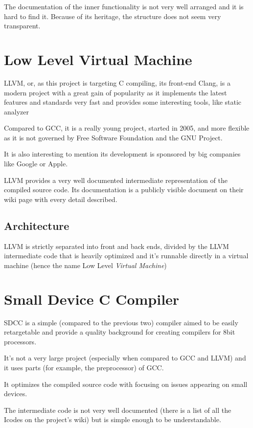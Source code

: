     The documentation of the inner functionality is not very well arranged and it is hard to find it. Because of its heritage, the structure does not seem very transparent.

    \section{Low Level Virtual Machine}

    LLVM, or, as this project is targeting C compiling, its front-end Clang, is a modern project with a great gain of popularity as it implements the latest features and standards very fast and provides some interesting tools, like static analyzer

    Compared to GCC, it is a really young project, started in 2005, and more flexible as it is not governed by Free Software Foundation and the GNU Project.

    It is also interesting to mention its development is sponsored by big companies like Google or Apple.

    LLVM provides a very well documented intermediate representation of the compiled source code. Its documentation is a publicly visible document on their wiki page with every detail described.

        \subsection{Architecture}

        LLVM is strictly separated into front and back ends, divided by the LLVM intermediate code that is heavily optimized and it's runnable directly in a virtual machine (hence the name Low Level \emph{Virtual Machine})

    \section{Small Device C Compiler}

    SDCC is a simple (compared to the previous two) compiler aimed to be easily retargetable and provide a quality background for creating compilers for 8bit processors.

    It's not a very large project (especially when compared to GCC and LLVM) and it uses parts (for example, the preprocessor) of GCC.

    It optimizes the compiled source code with focusing on issues appearing on small devices.

    The intermediate code is not very well documented (there is a list of all the Icodes on the project's wiki) but is simple enough to be understandable.


